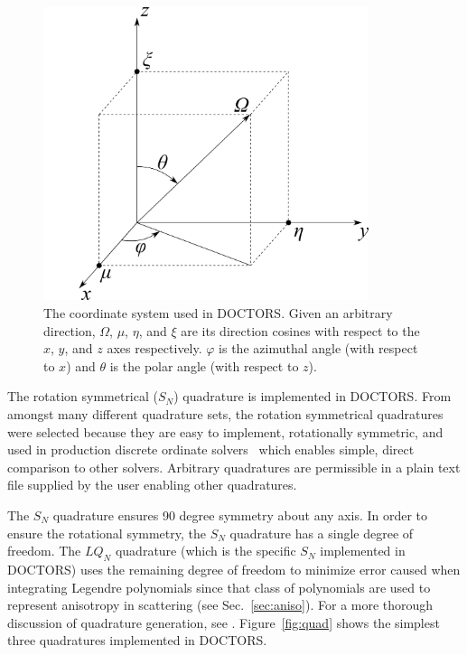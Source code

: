 \begin{figure}[tb]
  \begin{center}
   \includegraphics[width=3.75in]{figs/coord_sys}
  \end{center}
  \caption{The coordinate system used in DOCTORS. Given an arbitrary direction, $\Omega$, $\mu$, $\eta$, and $\xi$ are its direction cosines with respect to the $x$, $y$, and $z$ axes respectively. $\varphi$ is the azimuthal angle (with respect to $x$) and $\theta$ is the polar angle (with respect to $z$).}
\label{fig:coord_sys}
\end{figure}

The rotation symmetrical ($S_N$) quadrature is implemented in DOCTORS. From amongst many different quadrature sets, the rotation symmetrical quadratures were selected because they are easy to implement, rotationally symmetric, and used in production discrete ordinate solvers~\citep{ref:evanst} which enables simple, direct comparison to other solvers. Arbitrary quadratures are permissible in a plain text file supplied by the user enabling other quadratures.

The $S_N$ quadrature ensures 90 degree symmetry about any axis. In order to ensure the rotational symmetry, the $S_N$ quadrature has a single degree of freedom. The $LQ_N$ quadrature (which is the specific $S_N$ implemented in DOCTORS) uses the remaining degree of freedom to minimize error caused when integrating Legendre polynomials since that class of polynomials are used to represent anisotropy in scattering (see Sec.~\ref{sec:aniso}). For a more thorough discussion of quadrature generation, see \citet{ref:lewise}. Figure~\ref{fig:quad} shows the simplest three quadratures implemented in DOCTORS.

